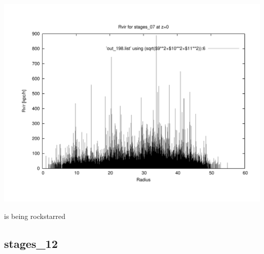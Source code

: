 \includegraphics[scale=0.3]{stages_07/plot_rvir_z0.pdf}

is being rockstarred  \\
 
% 
%
%
%
%
%
%
%

\newpage
\subsection{stages\_12}

